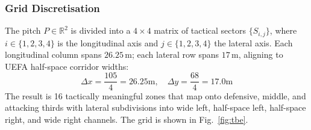 \documentclass[conference]{IEEEtran}
\begin{document}
\subsubsection{Grid Discretisation}
The pitch $P \in \mathbb{R}^2$ is divided into a $4 \times 4$ matrix of tactical sectors $\{S_{i,j}\}$, where $i \in \{1,2,3,4\}$ is the longitudinal axis and $j \in \{1,2,3,4\}$ the lateral axis. Each longitudinal column spans $26.25\,\text{m}$; each lateral row spans $17\,\text{m}$, aligning to UEFA half-space corridor widths:
\begin{equation}
    \Delta x = \frac{105}{4} = 26.25\text{m}, \quad
    \Delta y = \frac{68}{4} = 17.0\text{m}
\end{equation}
The result is 16 tactically meaningful zones that map onto defensive, middle, and attacking thirds with lateral subdivisions into wide left, half-space left, half-space right, and wide right channels. The grid is shown in Fig.~\ref{fig:tbe}.
\end{document}
